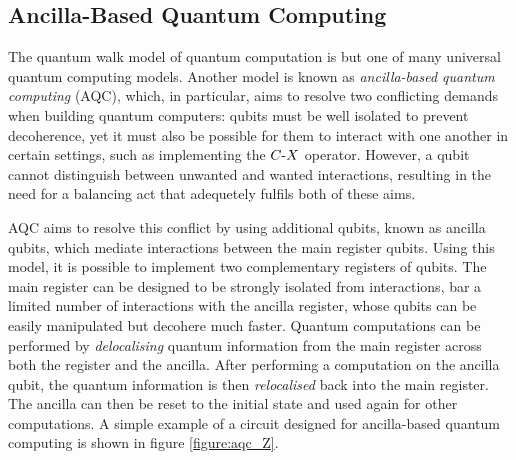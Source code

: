 \subsection{Ancilla-Based Quantum Computing}
The quantum walk model of quantum computation is but one of many universal quantum computing models.
Another model is known as \emph{ancilla-based quantum computing} (AQC), which, in particular, aims to resolve two conflicting demands when building quantum computers: qubits must be well isolated to prevent decoherence, yet it must also be possible for them to interact with one another in certain settings, such as implementing the $C\text{-}X$ operator.
However, a qubit cannot distinguish between unwanted and wanted interactions, resulting in the need for a balancing act that adequetely fulfils both of these aims.

AQC aims to resolve this conflict by using additional qubits, known as ancilla qubits, which mediate interactions between the main register qubits. 
Using this model, it is possible to implement two complementary registers of qubits.
The main register can be designed to be strongly isolated from interactions, bar a limited number of interactions with the ancilla register, whose qubits can be easily manipulated but decohere much faster.
Quantum computations can be performed by \emph{delocalising} quantum information from the main register across both the register and the ancilla.
After performing a computation on the ancilla qubit, the quantum information is then \emph{relocalised} back into the main register.
The ancilla can then be reset to the initial state and used again for other computations.
A simple example of a circuit designed for ancilla-based quantum computing is shown in figure \ref{figure:aqc_Z}. 

